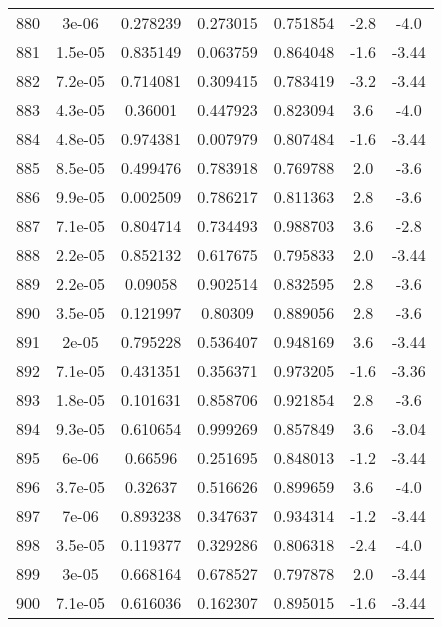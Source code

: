 \begin{table}
\begin{tabular}{c|c|c|c|c|c|c}
880 & 3e-06 & 0.278239 & 0.273015 & 0.751854 & -2.8 & -4.0\\
881 & 1.5e-05 & 0.835149 & 0.063759 & 0.864048 & -1.6 & -3.44\\
882 & 7.2e-05 & 0.714081 & 0.309415 & 0.783419 & -3.2 & -3.44\\
883 & 4.3e-05 & 0.36001 & 0.447923 & 0.823094 & 3.6 & -4.0\\
884 & 4.8e-05 & 0.974381 & 0.007979 & 0.807484 & -1.6 & -3.44\\
885 & 8.5e-05 & 0.499476 & 0.783918 & 0.769788 & 2.0 & -3.6\\
886 & 9.9e-05 & 0.002509 & 0.786217 & 0.811363 & 2.8 & -3.6\\
887 & 7.1e-05 & 0.804714 & 0.734493 & 0.988703 & 3.6 & -2.8\\
888 & 2.2e-05 & 0.852132 & 0.617675 & 0.795833 & 2.0 & -3.44\\
889 & 2.2e-05 & 0.09058 & 0.902514 & 0.832595 & 2.8 & -3.6\\
890 & 3.5e-05 & 0.121997 & 0.80309 & 0.889056 & 2.8 & -3.6\\
891 & 2e-05 & 0.795228 & 0.536407 & 0.948169 & 3.6 & -3.44\\
892 & 7.1e-05 & 0.431351 & 0.356371 & 0.973205 & -1.6 & -3.36\\
893 & 1.8e-05 & 0.101631 & 0.858706 & 0.921854 & 2.8 & -3.6\\
894 & 9.3e-05 & 0.610654 & 0.999269 & 0.857849 & 3.6 & -3.04\\
895 & 6e-06 & 0.66596 & 0.251695 & 0.848013 & -1.2 & -3.44\\
896 & 3.7e-05 & 0.32637 & 0.516626 & 0.899659 & 3.6 & -4.0\\
897 & 7e-06 & 0.893238 & 0.347637 & 0.934314 & -1.2 & -3.44\\
898 & 3.5e-05 & 0.119377 & 0.329286 & 0.806318 & -2.4 & -4.0\\
899 & 3e-05 & 0.668164 & 0.678527 & 0.797878 & 2.0 & -3.44\\
900 & 7.1e-05 & 0.616036 & 0.162307 & 0.895015 & -1.6 & -3.44\\
\end{tabular}
\end{table}
\newpage
